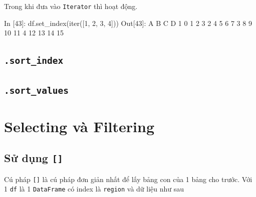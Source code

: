 \documentclass[
]{book}
\newenvironment{Shaded}{\begin{snugshade}}{\end{snugshade}}
\newcommand{\BuiltInTok}[1]{#1}
\newcommand{\DecValTok}[1]{\textcolor[rgb]{0.00,0.00,0.81}{#1}}
\newcommand{\NormalTok}[1]{#1}
\begin{document}
Trong khi đưa vào \texttt{Iterator} thì hoạt động.

\begin{Shaded}
\begin{Highlighting}[]
\NormalTok{In [}\DecValTok{43}\NormalTok{]: df.set\_index(}\BuiltInTok{iter}\NormalTok{([}\DecValTok{1}\NormalTok{, }\DecValTok{2}\NormalTok{, }\DecValTok{3}\NormalTok{, }\DecValTok{4}\NormalTok{]))}
\NormalTok{Out[}\DecValTok{43}\NormalTok{]:}
\NormalTok{    A   B   C   D}
\DecValTok{1}   \DecValTok{0}   \DecValTok{1}   \DecValTok{2}   \DecValTok{3}
\DecValTok{2}   \DecValTok{4}   \DecValTok{5}   \DecValTok{6}   \DecValTok{7}
\DecValTok{3}   \DecValTok{8}   \DecValTok{9}  \DecValTok{10}  \DecValTok{11}
\DecValTok{4}  \DecValTok{12}  \DecValTok{13}  \DecValTok{14}  \DecValTok{15}
\end{Highlighting}
\end{Shaded}

\hypertarget{sort_index}{%
\section{\texorpdfstring{\texttt{.sort\_index}}{.sort\_index}}\label{sort_index}}

\hypertarget{sort_values}{%
\section{\texorpdfstring{\texttt{.sort\_values}}{.sort\_values}}\label{sort_values}}

\hypertarget{selecting-vuxe0-filtering}{%
\chapter{Selecting và Filtering}\label{selecting-vuxe0-filtering}}

\hypertarget{sux1eed-dux1ee5ng}{%
\section{\texorpdfstring{Sử dụng \texttt{{[}{]}}}{Sử dụng {[}{]}}}\label{sux1eed-dux1ee5ng}}

Cú pháp \texttt{{[}{]}} là cú pháp đơn giản nhất để lấy bảng con của 1 bảng cho trước.
Với 1 \texttt{df} là 1 \texttt{DataFrame} có index là \texttt{region} và dữ liệu như sau
\end{document}
